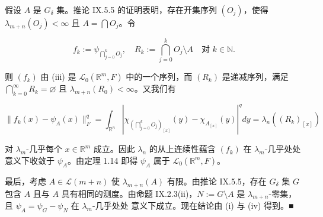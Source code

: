 \begin{lemma}
\begin{subitems}
假设 $ A $ 是 $ G_\delta $ 集。推论 IX.5.5 的证明表明，存在开集序列 $ (O_j) $，使得 $ \lambda_{m+n}(O_j) < \infty $ 且 $ A = \bigcap O_j $。令

\[
f_k := \psi_{\bigcap_{j=0}^{k}O_j} , \quad R_k := \bigcap_{j=0}^{k}O_j\setminus A \quad \text{对 } k \in \mathbb{N} .
\]

则 $ (f_k) $ 由 (iii) 是 $ \mathcal{L}_0(\mathbb{R}^m,F) $ 中的一个序列，而 $ (R_k) $ 是递减序列，满足 $ \bigcap_{k=0}^{\infty} R_k = \varnothing $ 且 $ \lambda_{m+n}(R_0) < \infty $。又我们有

\[
\|f_k(x) - \psi_A(x)\|_F^q = \int_{\mathbb{R}^n}\left|\chi_{(\bigcap_{j=0}^{k}O_j)_{[x]}}(y) - \chi_{A_{[x]}}(y)\right|^q dy = \lambda_n((R_k)_{[x]})
\]

对 $ \lambda_m $-几乎每个 $ x \in \mathbb{R}^m $ 成立。因此 $ \lambda_n $ 的从上连续性蕴含 $ (f_k) $ 在 $ \lambda_m $-几乎处处 意义下收敛于 $ \psi_A $。由定理 1.14 即得 $ \psi_A $ 属于 $ \mathcal{L}_0(\mathbb{R}^m,F) $。

\item

最后，考虑 $ A \in \mathcal{L}(m+n) $ 使 $ \lambda_{m+n}(A) $ 有限。由推论 IX.5.5，存在 $ G_\delta $ 集 $ G $ 包含 $ A $ 且与 $ A $ 具有相同的测度。由命题 IX.2.3(ii)，$ N := G\setminus A $ 是 $ \lambda_{m+n} $-零集，且 $ \psi_A = \psi_G - \psi_N $ 在 $ \lambda_m $-几乎处处 意义下成立。现在结论由 (i) 与 (iv) 得到。\nobreak\hspace{0.35em}■

\end{subitems}

\end{lemma}

